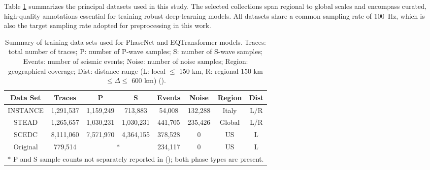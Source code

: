 Table \ref{tab:datasets} summarizes the principal datasets used in this study.
The selected collections span regional to global scales and encompass curated,
high-quality annotations essential for training robust deep-learning models.
All datasets share a common sampling rate of 100~Hz, which is also the target
sampling rate adopted for preprocessing in this work.

\begin{table}[h!]
  \centering
  \caption{
    Summary of training data sets used for PhaseNet \cite{PhaseNet} and
    EQTransformer \cite{EQTransformer} models. Traces: total number of traces;
    P: number of P-wave samples; S: number of S-wave samples; Events: number of
    seismic events; Noise: number of noise samples; Region: geographical
    coverage; Dist: distance range (L: local $\leq$ 150 km, R: regional 150 km
    $\leq\Delta\leq$ 600 km) (\cite{SeisBench}).
  }
  \begin{tabular}{c|c|c|c|c|c|c|c|}
    Data Set &   Traces  & P         &   S       &  Events &   Noise
    & Region & Dist \\\hline
    INSTANCE & 1,291,537 & 1,159,249 &   713,883 &  54,008 & 132,288
    & Italy  &  L/R \\\hline
    STEAD    & 1,265,657 & 1,030,231 & 1,030,231 & 441,705 & 235,426
    & Global &  L/R \\\hline
    SCEDC    & 8,111,060 & 7,571,970 & 4,364,155 & 378,528 &       0
    & US     &   L  \\\hline
    Original &   779,514 & \multicolumn{2}{c|}{$\ast$} &  234,117 &
    0 & US     &   L  \\\hline
    \multicolumn{8}{l}{
      \footnotesize $\ast$ P and S sample counts not separately reported in
    (\cite{PhaseNet}); both phase types are present.}
  \end{tabular}
  \label{tab:datasets}
\end{table}